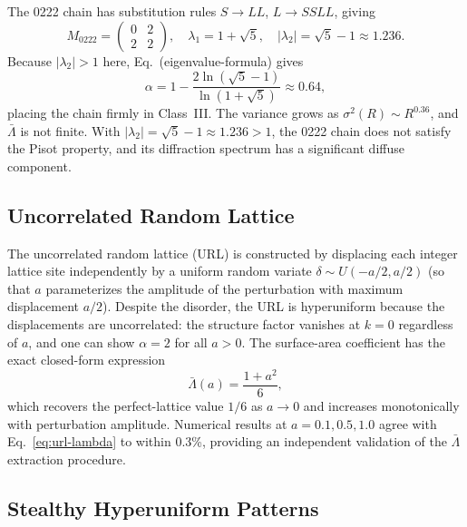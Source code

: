 \documentclass[11pt]{article}
\begin{document}
The 0222 chain has substitution rules $S \to LL$, $L \to SSLL$, giving
\begin{equation}
  M_{0222} = \begin{pmatrix} 0 & 2 \\ 2 & 2 \end{pmatrix},
  \quad \lambda_1 = 1 + \sqrt{5}, \quad |\lambda_2| = \sqrt{5} - 1 \approx 1.236.
  \label{eq:0222-matrix}
\end{equation}
Because $|\lambda_2| > 1$ here, Eq.~(eigenvalue-formula) gives
\begin{equation}
  \alpha = 1 - \frac{2\ln(\sqrt{5}-1)}{\ln(1+\sqrt{5})} \approx 0.64,
  \label{eq:0222-alpha}
\end{equation}
placing the chain firmly in Class~III. The variance grows as $\sigma^2(R) \sim R^{0.36}$,
and $\bar{\Lambda}$ is not finite. With $|\lambda_2| = \sqrt{5}-1 \approx 1.236 > 1$, the
0222 chain does not satisfy the Pisot property, and its diffraction spectrum has a significant
diffuse component.

\subsection{Uncorrelated Random Lattice}
\label{sec:url}

The uncorrelated random lattice (URL) is constructed by displacing each integer lattice
site independently by a uniform random variate $\delta \sim U(-a/2, a/2)$ (so that $a$
parameterizes the amplitude of the perturbation with maximum displacement $a/2$). Despite the disorder,
the URL is hyperuniform because the displacements are uncorrelated: the structure factor
vanishes at $k = 0$ regardless of $a$, and one can show $\alpha = 2$ for all $a > 0$.
The surface-area coefficient has the exact closed-form
expression~\cite{klatt2020perturbed}
\begin{equation}
  \bar{\Lambda}(a) = \frac{1+a^2}{6},
  \label{eq:url-lambda}
\end{equation}
which recovers the perfect-lattice value $1/6$ as $a \to 0$ and increases monotonically
with perturbation amplitude. Numerical results at $a = 0.1, 0.5, 1.0$ agree with
Eq.~\eqref{eq:url-lambda} to within 0.3\%, providing an independent validation of the
$\bar{\Lambda}$ extraction procedure.

\subsection{Stealthy Hyperuniform Patterns}
\label{sec:stealthy}
\end{document}
